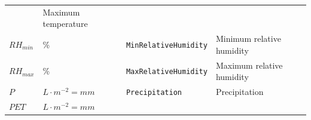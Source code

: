 \documentclass[]{book}
\begin{document}
\begin{longtable}[]{@{}llll@{}}
\begin{minipage}[t]{0.12\columnwidth}
\end{minipage} & \begin{minipage}[t]{0.45\columnwidth}\raggedright
Maximum temperature\strut
\end{minipage}\tabularnewline
\begin{minipage}[t]{0.11\columnwidth}\raggedright
\(RH_{min}\)\strut
\end{minipage} & \begin{minipage}[t]{0.10\columnwidth}\raggedright
\%\strut
\end{minipage} & \begin{minipage}[t]{0.12\columnwidth}\raggedright
\texttt{MinRelativeHumidity}\strut
\end{minipage} & \begin{minipage}[t]{0.45\columnwidth}\raggedright
Minimum relative humidity\strut
\end{minipage}\tabularnewline
\begin{minipage}[t]{0.11\columnwidth}\raggedright
\(RH_{max}\)\strut
\end{minipage} & \begin{minipage}[t]{0.10\columnwidth}\raggedright
\%\strut
\end{minipage} & \begin{minipage}[t]{0.12\columnwidth}\raggedright
\texttt{MaxRelativeHumidity}\strut
\end{minipage} & \begin{minipage}[t]{0.45\columnwidth}\raggedright
Maximum relative humidity\strut
\end{minipage}\tabularnewline
\begin{minipage}[t]{0.11\columnwidth}\raggedright
\(P\)\strut
\end{minipage} & \begin{minipage}[t]{0.10\columnwidth}\raggedright
\(L \cdot m^{-2} = mm\)\strut
\end{minipage} & \begin{minipage}[t]{0.12\columnwidth}\raggedright
\texttt{Precipitation}\strut
\end{minipage} & \begin{minipage}[t]{0.45\columnwidth}\raggedright
Precipitation\strut
\end{minipage}\tabularnewline
\begin{minipage}[t]{0.11\columnwidth}\raggedright
\(PET\)\strut
\end{minipage} & \begin{minipage}[t]{0.10\columnwidth}\raggedright
\(L \cdot m^{-2} = mm\)\strut

\end{minipage}
\end{longtable}
\end{document}
